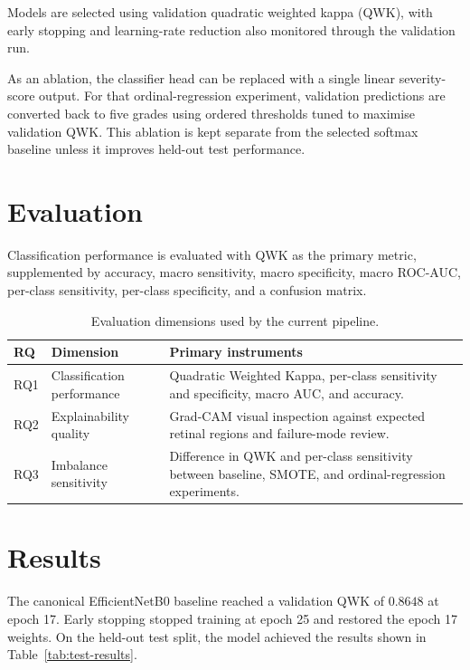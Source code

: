 \documentclass[11pt,a4paper]{article}
\begin{document}
Models are selected using validation quadratic weighted kappa (QWK), with early
stopping and learning-rate reduction also monitored through the validation run.

As an ablation, the classifier head can be replaced with a single linear
severity-score output. For that ordinal-regression experiment, validation
predictions are converted back to five grades using ordered thresholds tuned to
maximise validation QWK. This ablation is kept separate from the selected
softmax baseline unless it improves held-out test performance.

\section{Evaluation}
\label{sec:evaluation}

Classification performance is evaluated with QWK as the primary metric,
supplemented by accuracy, macro sensitivity, macro specificity, macro ROC-AUC,
per-class sensitivity, per-class specificity, and a confusion matrix.

\begin{table}[t]
  \centering
  \caption{Evaluation dimensions used by the current pipeline.}
  \label{tab:evaluation}
  \begin{tabularx}{\textwidth}{p{1.1cm}p{3.0cm}X}
    \toprule
    RQ & Dimension & Primary instruments \\
    \midrule
    RQ1 & Classification performance & Quadratic Weighted Kappa, per-class sensitivity and specificity, macro AUC, and accuracy. \\
    RQ2 & Explainability quality & Grad-CAM visual inspection against expected retinal regions and failure-mode review. \\
    RQ3 & Imbalance sensitivity & Difference in QWK and per-class sensitivity between baseline, SMOTE, and ordinal-regression experiments. \\
    \bottomrule
  \end{tabularx}
\end{table}

\section{Results}
\label{sec:results}

The canonical EfficientNetB0 baseline reached a validation QWK of \(0.8648\) at
epoch 17. Early stopping stopped training at epoch 25 and restored the epoch 17
weights. On the held-out test split, the model achieved the results shown in
Table~\ref{tab:test-results}.
\end{document}
